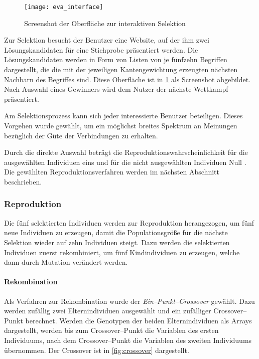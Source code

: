\begin{figure}
\centering
\texttt{[image: eva\_interface]}
\caption{Screenshot der Oberfläche zur interaktiven Selektion}
\label{fig:eva_interface}
\end{figure}

Zur Selektion besucht der Benutzer eine Website, auf der ihm zwei Lösungskandidaten für eine Stichprobe präsentiert werden. Die Lösungskandidaten werden in Form von Listen von je fünfzehn Begriffen dargestellt, die die mit der jeweiligen Kantengewichtung erzeugten nächsten Nachbarn des Begriffes sind. Diese Oberfläche ist in \cref{fig:eva_interface} als Screenshot abgebildet. Nach Auswahl eines Gewinners wird dem Nutzer der nächste Wettkampf präsentiert.

Am Selektionsprozess kann sich jeder interessierte Benutzer beteiligen. Dieses Vorgehen wurde gewählt, um ein möglichst breites Spektrum an Meinungen bezüglich der Güte der Verbindungen zu erhalten.

Durch die direkte Auswahl beträgt die Reproduktionswahrscheinlichkeit für die ausgewählten Individuen eins und für die nicht ausgewählten Individuen Null \cite{sd2012}. Die gewählten Reproduktionsverfahren werden im nächsten Abschnitt beschrieben.

\subsubsection{Reproduktion}

Die fünf selektierten Individuen werden zur Reproduktion herangezogen, um fünf neue Individuen zu erzeugen, damit die Populationsgröße für die nächste Selektion wieder auf zehn Individuen steigt. Dazu werden die selektierten Individuen zuerst rekombiniert, um fünf Kindindividuen zu erzeugen, welche dann durch Mutation verändert werden.

\paragraph{Rekombination}

Als Verfahren zur Rekombination wurde der \emph{Ein--Punkt--Crossover} \cite{kw2007} gewählt. Dazu werden zufällig zwei Elternindividuen ausgewählt und ein zufälliger Crossover--Punkt berechnet. Werden die Genotypen der beiden Elternindividuen als Arrays dargestellt, werden bis zum Crossover--Punkt die Variablen des ersten Individuums, nach dem Crossover--Punkt die Variablen des zweiten Individuums übernommen. Der Crossover ist in \cref{fig:crossover} dargestellt.

